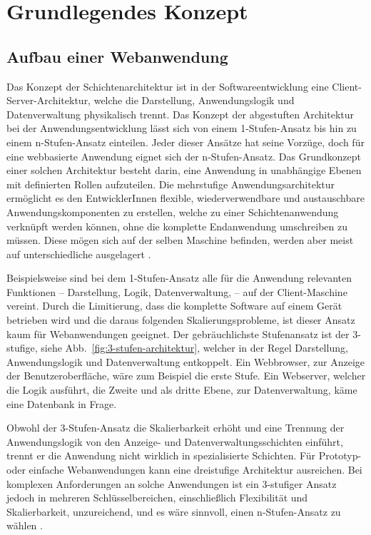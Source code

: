 \chapter{Grundlegendes Konzept}

\section{Aufbau einer Webanwendung}
\label{cha:webapplication_structure}

Das Konzept der Schichtenarchitektur ist in der Softwareentwicklung eine Client-Server-Architektur, welche die Darstellung, Anwendungslogik und Datenverwaltung physikalisch trennt.  
Das Konzept der abgestuften Architektur bei der Anwendungsentwicklung lässt sich von einem 1-Stufen-Ansatz bis hin zu einem n-Stufen-Ansatz einteilen. Jeder dieser Ansätze hat seine Vorzüge, doch für eine webbasierte Anwendung eignet sich der n-Stufen-Ansatz. Das Grundkonzept einer solchen Architektur besteht darin, eine Anwendung in unabhängige Ebenen mit definierten Rollen aufzuteilen.
Die mehrstufige Anwendungsarchitektur ermöglicht es den EntwicklerInnen flexible, wiederverwendbare und austauschbare  Anwendungskomponenten zu erstellen, welche zu einer Schichtenanwendung verknüpft werden können, ohne die komplette Endanwendung umschreiben zu müssen.
Diese mögen sich auf der selben Maschine befinden, werden aber meist auf unterschiedliche ausgelagert \cite{wiki-ntier-architecture}.

Beispielsweise sind bei dem 1-Stufen-Ansatz alle für die Anwendung relevanten Funktionen -- Darstellung, Logik, Datenverwaltung, \etc -- auf der Client-Maschine vereint. Durch die Limitierung, dass die komplette Software auf einem Gerät betrieben wird und die daraus folgenden Skalierungsprobleme, ist dieser Ansatz kaum für Webanwendungen geeignet.
Der gebräuchlichste Stufenansatz ist der 3-stufige, siehe Abb.~\ref{fig:3-stufen-architektur}, welcher in der Regel Darstellung, Anwendungslogik und Datenverwaltung entkoppelt. Ein Webbrowser, zur Anzeige der Benutzeroberfläche, wäre zum Beispiel die erste Stufe. Ein Webserver, welcher die Logik ausführt, die Zweite und als dritte Ebene, zur Datenverwaltung, käme eine Datenbank in Frage. 

Obwohl der 3-Stufen-Ansatz die Skalierbarkeit erhöht und eine Trennung der Anwendungslogik von den Anzeige- und Datenverwaltungsschichten einführt, trennt er die Anwendung nicht wirklich in spezialisierte Schichten. Für Prototyp- oder einfache Webanwendungen kann eine dreistufige Architektur ausreichen. Bei komplexen Anforderungen an solche Anwendungen ist ein 3-stufiger Ansatz jedoch in mehreren Schlüsselbereichen, einschließlich Flexibilität und Skalierbarkeit, unzureichend, und es wäre sinnvoll, einen n-Stufen-Ansatz zu wählen \cite{nTier-architecture}.

